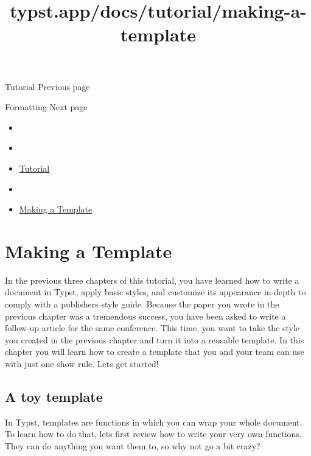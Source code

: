 \href{/docs/tutorial/}{\pandocbounded{}}

{ Tutorial } { Previous page }

\href{/docs/tutorial/formatting/}{\pandocbounded{}}

{ Formatting } { Next page }


\title{typst.app/docs/tutorial/making-a-template}

\begin{itemize}
\tightlist
\item
  \href{/docs}{}
\item
  
\item
  \href{/docs/tutorial/}{Tutorial}
\item
  
\item
  \href{/docs/tutorial/making-a-template/}{Making a Template}
\end{itemize}

\section{Making a Template}\label{making-a-template}

In the previous three chapters of this tutorial, you have learned how to
write a document in Typst, apply basic styles, and customize its
appearance in-depth to comply with a publisher\textquotesingle s style
guide. Because the paper you wrote in the previous chapter was a
tremendous success, you have been asked to write a follow-up article for
the same conference. This time, you want to take the style you created
in the previous chapter and turn it into a reusable template. In this
chapter you will learn how to create a template that you and your team
can use with just one show rule. Let\textquotesingle s get started!

\subsection{A toy template}\label{toy-template}

In Typst, templates are functions in which you can wrap your whole
document. To learn how to do that, let\textquotesingle s first review
how to write your very own functions. They can do anything you want them
to, so why not go a bit crazy?

